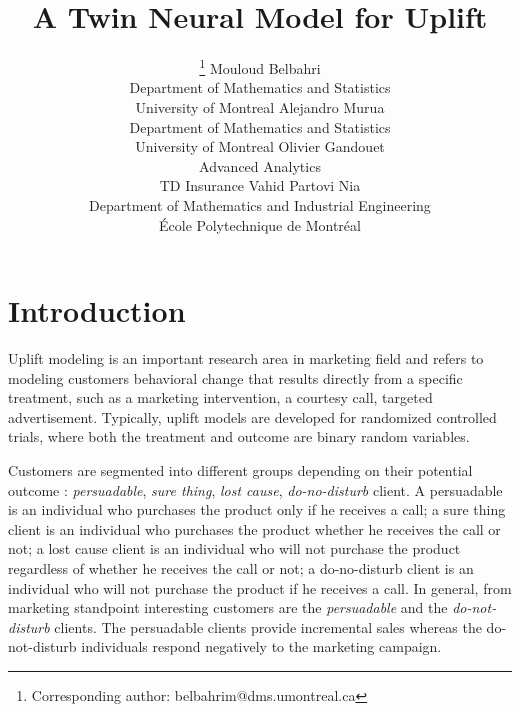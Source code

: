 \documentclass{article}
\title{A Twin Neural Model for Uplift}
\author{
  \thanks{Corresponding author: belbahrim@dms.umontreal.ca} Mouloud Belbahri \\
  Department of Mathematics and Statistics\\
  University of Montreal
  \And
  Alejandro Murua\\
  Department of Mathematics and Statistics\\
  University of Montreal
  \And
  Olivier Gandouet\\
  Advanced Analytics\\
  TD Insurance
  \And
  Vahid Partovi Nia \\
  Department of Mathematics and Industrial Engineering\\
  École Polytechnique de Montréal
}
\def \vahid {\color{magenta}}
\begin{document}
\maketitle

\begin{abstract}
\vahid{clarify the strategy for the paper. We must start with providing some ground about re-defining the loss. Then hammering on prediction power as the most important issue for uplift in practice and neural networks as a successful tool that targets prediction power. We must argue with beating common existing models in terms of performance. We will follow the sections in the same order as we mention in the abstract. Hammer on methodology, combined with pruning. }
\end{abstract}



\section{Introduction}
\label{sec:intro}

Uplift modeling is an important research area  in marketing field \citep{radcliffe1999differential, hansotia2002direct, lo2002true, radcliffe2007using} and refers to modeling customers behavioral change that results directly from a specific treatment, such as a marketing intervention, a courtesy call, targeted advertisement. Typically, uplift models are developed for randomized controlled trials, where both the treatment and outcome are binary random variables. %


Customers are segmented into different groups depending on their  potential outcome \citep{kane2014mining}:  \textit{persuadable}, \textit{sure thing}, \textit{lost cause}, \textit{do-no-disturb}  client. A persuadable is an individual who purchases the product only if he receives a call; a sure thing client is an individual who purchases the product whether he receives the call or not; a lost cause client is an individual who will not purchase the product regardless of whether he receives the call or not; a do-no-disturb client is an individual who will not purchase the product if he receives a call. In general, from marketing standpoint  interesting customers are the \textit{persuadable} and the \textit{do-not-disturb} clients. The persuadable clients provide incremental sales whereas the do-not-disturb individuals respond  negatively to the marketing campaign. %
\end{document}
